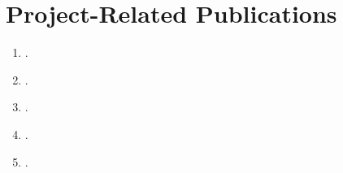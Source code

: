 \section*{Project-Related Publications}
\begin{enumerate}
    \item{}.
    \item{}.
    \item{}.
    \item{}.
    \item{}.
\end{enumerate}


